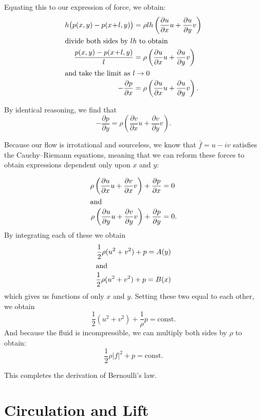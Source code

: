 \documentclass[letterpaper, twoside, 12 pt]{article}
\begin{document}
	Equating this to our expression of force, we obtain:
	\begin{align*}
		h \big( p(x, y) - p(x \!+\! l, y) \big) &= \rho lh \left( \frac{\partial u}{\partial x} u + \frac{\partial u}{\partial y} v \right)\\
		\intertext{divide both sides by $lh$ to obtain}
		\frac{p(x, y) - p(x \!+\! l, y)}{l} &= \rho \left( \frac{\partial u}{\partial x} u + \frac{\partial u}{\partial y} v \right) \\
		\intertext{and take the limit as $l \to 0$}
		- \frac{\partial p}{\partial x} &= \rho \left( \frac{\partial u}{\partial x} u + \frac{\partial u}{\partial y} v \right).
	\end{align*}
	
	By identical reasoning, we find that
	\[
		- \frac{\partial p}{\partial y} = \rho \left( \frac{\partial v}{\partial x} u + \frac{\partial v}{\partial y} v \right).
	\]
	
	Because our flow is irrotational and sourceless, we know that $\bar f = u - iv$ satisfies the Cauchy--Riemann equations, meaning that we can reform these forces to obtain expressions dependent only upon $x$ and $y$:

	\begin{align*}
		\rho \left( \frac{\partial u}{\partial x} u + \frac{\partial v}{\partial x} v \right) + \frac{\partial p}{\partial x} &= 0 \\
		\intertext{and}
		\rho \left( \frac{\partial u}{\partial y} u + \frac{\partial v}{\partial y} v \right) + \frac{\partial p}{\partial y} &= 0. \\
	\end{align*}
	By integrating each of these we obtain
	\begin{align*}
		\frac{1}{2} \rho (u^2 + v^2) + p = A(y) \\
		\intertext{and}
		\frac{1}{2} \rho (u^2 + v^2) + p = B(x) \\
	\end{align*}
	which gives us functions of only $x$ and $y$.
	Setting these two equal to each other, we obtain
	\[
		\frac{1}{2} (u^2 + v^2) + \frac{1}{\rho} p = \mathrm{const.}
	\]
	And because the fluid is incompressible, we can multiply both sides by $\rho$ to obtain:
	\[
		\frac{1}{2} \rho |f|^2 + p = \mathrm{const.}
	\]

	This completes the derivation of Bernoulli's law.

\section{Circulation and Lift} %
\label{sec:circulation_and_lift}
\end{document}
